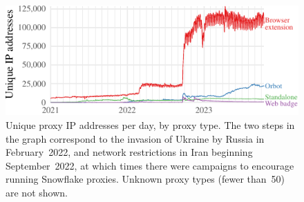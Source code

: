 \documentclass[letterpaper,twocolumn]{article}
\begin{document}
\begin{figure}
\includegraphics{figures/proxies/proxy-type}
\caption{
Unique proxy IP addresses per day,
by proxy type.
The two steps in the graph correspond
to the invasion of Ukraine by Russia in February~2022,
and network restrictions in Iran beginning September~2022,
at which times there were campaigns
to encourage running Snowflake proxies.
Unknown proxy types (fewer than~50) are not shown.
}
\label{fig:proxy-type}
\end{figure}
\end{document}
